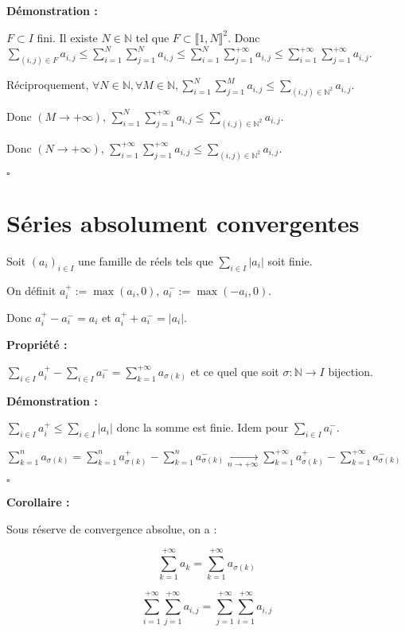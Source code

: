 \documentclass[10pt,a4paper,notitlepage ]{report}
\newcounter{th}
\newenvironment{propriete}[1][]{
	\begin{tcolorbox}
		\textbf{Propriété #1 : }
}
{\end{tcolorbox}}
\newenvironment{demo}[1][]{

	\textbf{Démonstration #1 :}
}{\begin{flushright}
	$\square$
\end{flushright}
}
\newenvironment{corollaire}{
	\begin{tcolorbox}
		\textbf{Corollaire : }
	}
	{\end{tcolorbox}}
\begin{document}
\begin{demo}
	$F\subset I$ fini. Il existe $N \in \mathbb N$ tel que $F \subset \llbracket 1,N\rrbracket^2$. Donc $\sum_{(i,j)\in F}a_{i,j} \le \sum_{i=1}^{N}\sum_{j=1}^{N}a_{i,j} \le
	\sum_{i=1}^N\sum_{j=1}^{+\infty}a_{i,j} \le
	\sum_{i=1}^{+\infty}\sum_{j=1}^{+\infty}a_{i,j}$.
	
	Réciproquement, $\forall N\in\mathbb N, \forall M \in\mathbb N, \sum_{i=1}^N\sum_{j=1}^Ma_{i,j} \le
	\sum_{(i,j)\in \mathbb N^2}a_{i,j}$.
	
	Donc $(M\rightarrow +\infty)$, $\sum_{i=1}^N\sum_{j=1}^{+\infty}a_{i,j} \le
	\sum_{(i,j)\in \mathbb N^2}a_{i,j}$.
	
	Donc $(N\rightarrow +\infty)$, $\sum_{i=1}^{+\infty}\sum_{j=1}^{+\infty}a_{i,j} \le
	\sum_{(i,j)\in \mathbb N^2}a_{i,j}$.
\end{demo}

\section{Séries absolument convergentes}

Soit $(a_i)_{i\in I}$ une famille de réels tels que $\sum_{i\in I}|a_i|$ soit finie.

On définit $a_i^+ := \max(a_i,0)$, $a_i^- := \max(-a_i, 0)$.

Donc $a_i^+ - a_i^- = a_i$ et $a_i^+ + a_i^- = |a_i|$.

\begin{propriete}
	$\sum_{i\in I}a_i^+ - \sum_{i\in I}a_i^- = \sum_{k=1}^{+\infty}a_{\sigma(k)}$ et ce quel que soit $\sigma : \mathbb N \rightarrow I$ bijection.
\end{propriete}

\begin{demo}
	$\sum_{i\in I}a_i^+ \le \sum_{i\in I} |a_i|$ donc la somme est finie. Idem pour $\sum_{i\in I}a_i^-$.
	
	$\sum_{k=1}^n a_{\sigma(k)} = \sum_{k=1}^n a_{\sigma(k)}^+ - \sum_{k=1}^n a_{\sigma(k)}^- \underset{n\rightarrow +\infty}{\rightarrow}
	\sum_{k=1}^{+\infty}a_{\sigma(k)}^+ - \sum_{k=1}^{+\infty}a_{\sigma(k)}^-$
\end{demo}
\begin{corollaire}
	Sous réserve de convergence absolue, on a :
	
	\[\sum_{k=1}^{+\infty}a_k = \sum_{k=1}^{+\infty} a_{\sigma(k)}\]
	
	\[\sum_{i=1}^{+\infty}\sum_{j=1}^{+\infty}a_{i,j} =
	\sum_{j=1}^{+\infty}\sum_{i=1}^{+\infty}a_{i,j}\]
\end{corollaire}
\end{document}
